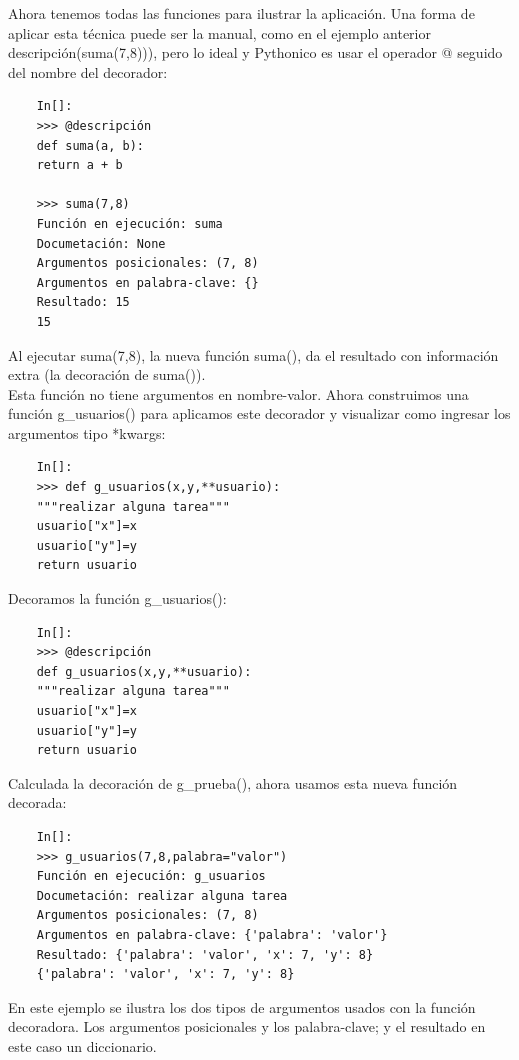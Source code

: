 Ahora tenemos todas las funciones para ilustrar la aplicación. Una forma de aplicar esta técnica puede ser la manual, como en el ejemplo anterior {\ttfamily descripción(suma(7,8))}), pero lo ideal y Pythonico es usar el operador {\ttfamily @} seguido del nombre del decorador:

\begin{lstlisting}
	In[]:
	>>> @descripción
	def suma(a, b):
	return a + b
	
	>>> suma(7,8)
	Función en ejecución: suma
	Documetación: None
	Argumentos posicionales: (7, 8)
	Argumentos en palabra-clave: {}
	Resultado: 15
	15
\end{lstlisting}
Al ejecutar {\ttfamily suma(7,8)},  la nueva función {\ttfamily suma()}, da el resultado con información extra (la decoración de {\ttfamily suma()}).\\


Esta función no tiene argumentos en nombre-valor. Ahora construimos una función {\ttfamily g\_usuarios()} para aplicamos este decorador y visualizar como ingresar los argumentos tipo {\ttfamily**kwargs}:

\begin{lstlisting}
	In[]:
	>>> def g_usuarios(x,y,**usuario):
	"""realizar alguna tarea"""
	usuario["x"]=x
	usuario["y"]=y
	return usuario
\end{lstlisting}

Decoramos la función  {\ttfamily g\_usuarios()}:

\begin{lstlisting}
	In[]:
	>>> @descripción
	def g_usuarios(x,y,**usuario):
	"""realizar alguna tarea"""
	usuario["x"]=x
	usuario["y"]=y
	return usuario
\end{lstlisting}Calculada la decoración de  {\ttfamily g\_prueba()}, ahora usamos esta nueva función decorada: 

\begin{lstlisting}
	In[]:
	>>> g_usuarios(7,8,palabra="valor")
	Función en ejecución: g_usuarios
	Documetación: realizar alguna tarea
	Argumentos posicionales: (7, 8)
	Argumentos en palabra-clave: {'palabra': 'valor'}
	Resultado: {'palabra': 'valor', 'x': 7, 'y': 8}
	{'palabra': 'valor', 'x': 7, 'y': 8}
\end{lstlisting}

En este ejemplo se ilustra los dos tipos de argumentos usados con la función decoradora. Los argumentos posicionales y los palabra-clave; y  el resultado en este caso un diccionario. \\

